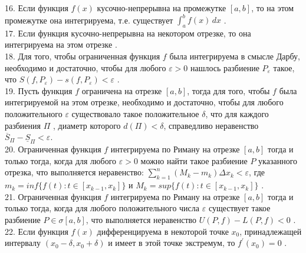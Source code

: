 \documentclass[12pt]{article}
\begin{document}
16. Если функция ${\displaystyle f(x)}$ кусочно-непрерывна на промежутке ${\displaystyle [a,b]}$, то на этом промежутке она интегрируема, т.е. существует ${\displaystyle \int _{a}^{b} f(x) \, dx}$ .\\

17. Если функция кусочно-непрерывна на некотором отрезке, то она интегрируема на этом отрезке .\\

18. Для того, чтобы ограниченная функция ${\displaystyle f}$ была интегрируема в смысле Дарбу, необходимо и достаточно, чтобы для любого ${\displaystyle \varepsilon>0}$ нашлось разбиение ${\displaystyle P_{\varepsilon}}$ такое, что ${\displaystyle S(f, P_{\varepsilon})-s(f, P_{\varepsilon})<\varepsilon}$ .\\

19. Пусть функция ${\displaystyle f}$ ограничена на отрезке ${\displaystyle \left[ {a,b} \right]}$, тогда для того, чтобы ${\displaystyle f}$ была интегрируемой на этом отрезке, необходимо и достаточно, чтобы  для любого положительного ${\displaystyle \varepsilon}$ существовало такое положительное ${\displaystyle \delta}$, что для каждого разбиения ${\displaystyle \Pi}$ , диаметр которого ${\displaystyle d\left( \Pi \right) < \delta}$, справедливо неравенство ${\displaystyle {\overline S_{\Pi} } - {\underline S_{\Pi}} < \varepsilon}$.\\

20. Ограниченная функция ${\displaystyle f}$ интегрируема по Риману на отрезке ${\displaystyle [a,b]}$ тогда и только тогда, когда для любого ${\displaystyle \varepsilon>0}$ можно найти такое разбиение ${\displaystyle P}$ указанного отрезка, что выполняется неравенство: ${\displaystyle \sum \limits _{k=1}^{n} (M_k-m_k)\Delta x_k<\varepsilon}$, где ${\displaystyle m_k=inf \{f(t):t\in[x_{k-1},x_k]\}}$ и ${\displaystyle M_k=sup \{f(t):t\in[x_{k-1},x_k]\}}$ .\\

21. Ограниченная функция ${\displaystyle f}$  интегрируема по Риману на отрезке ${\displaystyle [a,b]}$ тогда и только тогда, когда для любого положительного числа ${\displaystyle \varepsilon}$ существует такое разбиение ${\displaystyle P\in \sigma[a,b]}$, что выполняется неравенство ${\displaystyle U(P,f) - L(P,f) < 0}$ .\\

22. Если функция ${\displaystyle f(x)}$ дифференцируема в некоторой точке  ${\displaystyle x_0}$, принадлежащей интервалу ${\displaystyle (x_0-\delta,x_0+\delta)}$ и имеет в этой точке экстремум, то ${\displaystyle f^{\prime}(x_0)=0}$ .\\
\end{document}
